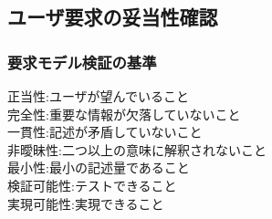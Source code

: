 \documentclass[8pt,twocolumn]{jsarticle}
\begin{document}
\subsection{ユーザ要求の妥当性確認}
\subsubsection{要求モデル検証の基準}
正当性:ユーザが望んでいること\\
完全性:重要な情報が欠落していないこと\\
一貫性:記述が矛盾していないこと\\
非曖昧性:二つ以上の意味に解釈されないこと\\
最小性:最小の記述量であること\\
検証可能性:テストできること\\
実現可能性:実現できること\\
\end{document}
